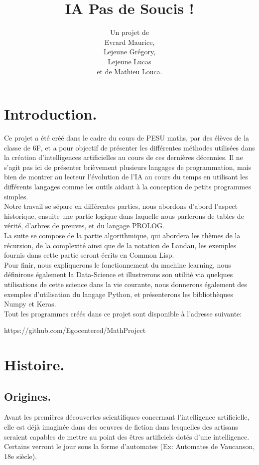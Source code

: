 \documentclass[a4paper, 12pt]{article}
\title{IA Pas de Soucis !}
\author{Un projet de \\Evrard Maurice,\\ Lejeune Grégory,\\ Lejeune Lucas \\ et de Mathieu Louca.}
\numberwithin{equation}{subsection}
\begin{document}
\onehalfspacing
\maketitle
\newpage
\tableofcontents
\newpage
\section{Introduction.}
Ce projet a été créé dans le cadre du cours de PESU maths, par des élèves de la classe de 6F, et a pour objectif de présenter les différentes méthodes utilisées dans la création d'intelligences artificielles au cours de ces dernières décennies. Il ne s'agit pas ici de présenter brièvement plusieurs langages de programmation, mais bien de montrer au lecteur l'évolution de l'IA au cours du temps en utilisant les différents langages comme les outils aidant à la conception de petits programmes simples.\\

Notre travail se sépare en différentes parties, nous abordons d'abord l'aspect historique, ensuite une partie logique dans laquelle nous parlerons de tables de vérité, d'arbres de preuves, et du langage PROLOG.\\

La suite se compose de la partie algorithmique, qui abordera les thèmes de la récursion, de la complexité ainsi que de la notation de Landau, les exemples fournis dans cette partie seront écrits en Common Lisp.\\

Pour finir, nous expliquerons le fonctionnement du machine learning, nous définirons également la Data-Science et illustrerons son utilité via quelques utilisations de cette science dans la vie courante,
nous donnerons également des exemples d'utilisation du langage Python, et présenterons les bibliothèques Numpy et Keras.\\

Tout les programmes créés dans ce projet sont disponible à l'adresse suivante: \begin{center}
  https://github.com/Egocentered/MathProject
\end{center}

\newpage
\section{Histoire.}
\subsection{Origines.}
Avant les premières découvertes scientifiques concernant l'intelligence artificielle, elle est déjà imaginée dans des oeuvres de fiction dans lesquelles des artisans seraient capables de mettre au point des êtres artificiels dotés d'une intelligence. Certains verront le jour sous la forme d'automates (Ex: Automates de Vaucanson, 18e siècle).\\
\end{document}
